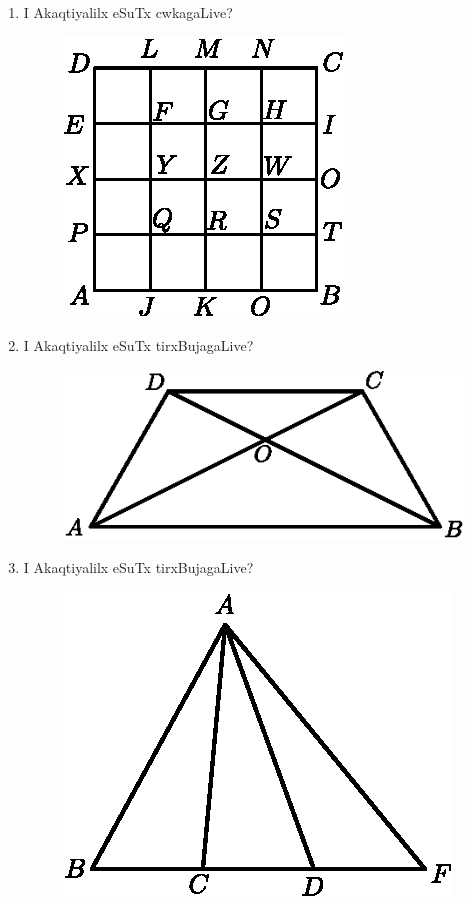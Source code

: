 \begin{enumerate}
\item I Akaqtiyalilx eSuTx cwkagaLive?
\begin{figure}[H]
\centering
\includegraphics{src/figures/exr4.eps}
\end{figure}

\item I Akaqtiyalilx eSuTx tirxBujagaLive?
\begin{figure}[H]
\centering
\includegraphics{src/figures/exr5.eps}
\end{figure}

\eject


\item I Akaqtiyalilx eSuTx tirxBujagaLive?
\begin{figure}[H]
\centering
\includegraphics{src/figures/exr6.eps}
\end{figure}


\end{enumerate}
